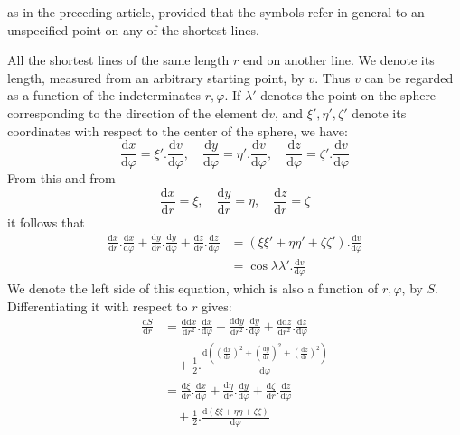 %
as in the preceding article, provided that the symbols refer in general to an unspecified point on any of the shortest lines.

All the shortest lines of the same length \(r\) end on another line. We denote its length, measured from an arbitrary starting point, by \(v\). Thus \(v\) can be regarded as a function of the indeterminates \(r,\varphi\). If \(\lambda'\) denotes the point on the sphere corresponding to the direction of the element \(\mathrm{d}v\), and \(\xi',\eta',\zeta'\) denote its coordinates with respect to the center of the sphere, we have:
\[
\frac{\mathrm{d}x}{\mathrm{d}\varphi}=\xi'\mathord{.}\frac{\mathrm{d}v}{\mathrm{d}\varphi},\quad
\frac{\mathrm{d}y}{\mathrm{d}\varphi}=\eta'\mathord{.}\frac{\mathrm{d}v}{\mathrm{d}\varphi},\quad
\frac{\mathrm{d}z}{\mathrm{d}\varphi}=\zeta'\mathord{.}\frac{\mathrm{d}v}{\mathrm{d}\varphi}
\]
From this and from
\[
\frac{\mathrm{d}x}{\mathrm{d}r}=\xi,\quad\frac{\mathrm{d}y}{\mathrm{d}r}=\eta,\quad\frac{\mathrm{d}z}{\mathrm{d}r}=\zeta
\]
it follows that
\[
\begin{aligned}
\frac{\mathrm{d}x}{\mathrm{d}r}\mathord{.}\frac{\mathrm{d}x}{\mathrm{d}\varphi}+\frac{\mathrm{d}y}{\mathrm{d}r}\mathord{.}\frac{\mathrm{d}y}{\mathrm{d}\varphi}+\frac{\mathrm{d}z}{\mathrm{d}r}\mathord{.}\frac{\mathrm{d}z}{\mathrm{d}\varphi}
&=(\xi\xi'+\eta\eta'+\zeta\zeta')\mathord{.}\frac{\mathrm{d}v}{\mathrm{d}\varphi}\\
&=\cos\lambda\lambda'\mathord{.}\frac{\mathrm{d}v}{\mathrm{d}\varphi}
\end{aligned}
\]
We denote the left side of this equation, which is also a function of \(r,\varphi\), by \(S\). Differentiating it with respect to \(r\) gives:
\[
\begin{aligned}
\frac{\mathrm{d}S}{\mathrm{d}r}&=\frac{\mathrm{d}\mathrm{d}x}{\mathrm{d}r^2}\mathord{.}\frac{\mathrm{d}x}{\mathrm{d}\varphi}+\frac{\mathrm{d}\mathrm{d}y}{\mathrm{d}r^2}\mathord{.}\frac{\mathrm{d}y}{\mathrm{d}\varphi}+\frac{\mathrm{d}\mathrm{d}z}{\mathrm{d}r^2}\mathord{.}\frac{\mathrm{d}z}{\mathrm{d}\varphi}\\
&\quad+\tfrac{1}{2}\mathord{.}\frac{\mathrm{d}((\tfrac{\mathrm{d}x}{\mathrm{d}r})^2+(\tfrac{\mathrm{d}y}{\mathrm{d}r})^2+(\tfrac{\mathrm{d}z}{\mathrm{d}r})^2)}{\mathrm{d}\varphi}\\
&=\frac{\mathrm{d}\xi}{\mathrm{d}r}\mathord{.}\frac{\mathrm{d}x}{\mathrm{d}\varphi}+\frac{\mathrm{d}\eta}{\mathrm{d}r}\mathord{.}\frac{\mathrm{d}y}{\mathrm{d}\varphi}+\frac{\mathrm{d}\zeta}{\mathrm{d}r}\mathord{.}\frac{\mathrm{d}z}{\mathrm{d}\varphi}\\
&\quad+\tfrac{1}{2}\mathord{.}\frac{\mathrm{d}(\xi\xi+\eta\eta+\zeta\zeta)}{\mathrm{d}\varphi}
\end{aligned}
\]
